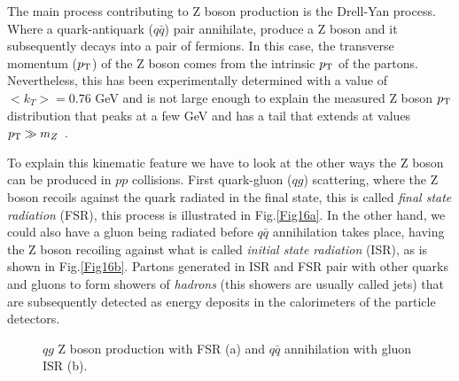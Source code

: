 The main process contributing to Z boson production is the Drell-Yan process. Where a quark-antiquark ($q\bar{q}$) pair annihilate, produce a Z boson and it subsequently decays into a pair of fermions. In this case, the transverse momentum ($p_\text{T}$) of the Z boson comes from the intrinsic $p_\text{T}$ of the partons. Nevertheless, this has been experimentally determined with a value of $<k_T>=0.76$ GeV \cite{Ellis:1991qj} and is not large enough to explain the measured Z boson $p_\text{T}$ distribution that peaks at a few GeV and has a tail that extends at values $p_\text{T}\gg m_Z$ \cite{Abbott:1999yd,Affolder:1999jh}.

To explain this kinematic feature we have to look at the other ways the Z boson can be produced in $pp$ collisions. First quark-gluon ($qg$) scattering, where the Z boson recoils against the quark radiated in the final state, this is called \textit{final state radiation} (FSR), this process is illustrated in Fig.\ref{Fig16a}. In the other hand, we could also have a gluon being radiated before $q\bar{q}$ annihilation takes place, having the Z boson recoiling against what is called \textit{initial state radiation} (ISR), as is shown in Fig.\ref{Fig16b}. Partons generated in ISR and FSR pair with other quarks and gluons to form showers of \textit{hadrons} (this showers are usually called jets) that are subsequently detected as energy deposits in the calorimeters of the particle detectors. 
\begin{figure}[ht]
	\centering
	\hfill
	\caption{$qg$ Z boson production with FSR (a) and $q\bar{q}$ annihilation with gluon ISR (b).}
	\label{Fig16}
\end{figure}
